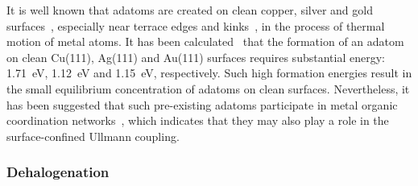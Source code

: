 \documentclass[journal=jacsat,manuscript=article]{achemso}
\newcommand{\comm}{\color{ForestGreen}} %
\begin{document}
{%

It is well known that adatoms are created on clean copper, silver and gold surfaces~\cite{ullmann_79, ullmann_58}, especially near terrace edges and kinks~\cite{ullmann_84, ullmann_85}, in the process of thermal motion of metal atoms. 
It has been calculated~\cite{chemeurope2017} that the formation of an adatom on clean Cu(111), Ag(111) and Au(111) surfaces requires substantial energy: \SI{1.71}{\electronvolt}, \SI{1.12}{\electronvolt} and \SI{1.15}{\electronvolt}, respectively. Such high formation energies result in the small equilibrium concentration of adatoms on clean surfaces.  
Nevertheless, it has been suggested that such pre-existing adatoms participate in metal organic coordination networks~\cite{ullmann_80, ullmann_81, ullmann_82, ullmann_83}, which indicates that they may also play a role in the surface-confined Ullmann coupling.


}

\ifdefined\INTERNAL

\subsubsection{Dehalogenation}
\end{document}
